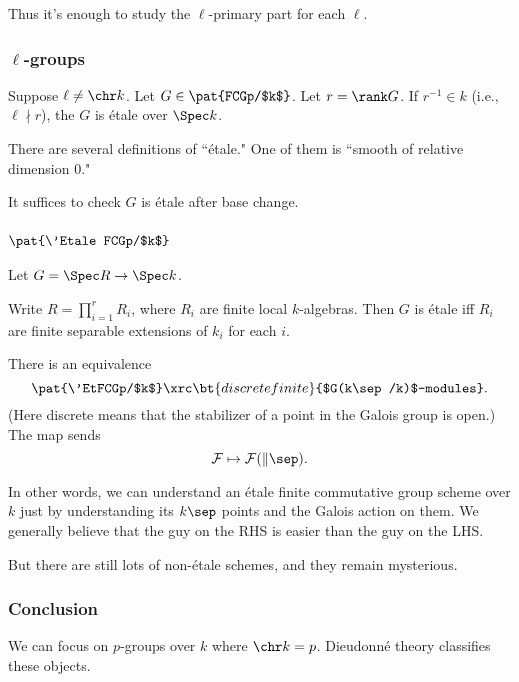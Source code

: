 Thus it's enough to study the $\ell$-primary part for each $\ell$.
\subsubsection{$\ell$-groups}

\begin{fct}
Suppose $\ell\ne \chr k$.
Let $G\in\pat{FCGp/$k$}$. Let $r=\rank G$. If $r^{-1}\in k$ (i.e., $\ell\nmid r$), the $G$ is \'etale over $\Spec k$.
\end{fct}
There are several definitions of ``\'etale." One of them is ``smooth of relative dimension 0."

It suffices to check $G$ is \'etale after base change. %
\subsubsection{$\pat{\'Etale FCGp/$k$}$}
Let $G=\Spec R\to \Spec k$.

Write $R=\prod_{i=1}^r R_i$, where $R_i$ are finite local $k$-algebras.
Then $G$ is \'etale iff $R_i$ are finite separable extensions of $k_i$ for each $i$.

\begin{pr}
There is an equivalence
\[
\pat{\'EtFCGp/$k$}\xrc \bt{discrete finite}{$G(k\sep/k)$-modules}.
\]
(Here discrete means that the stabilizer of a point in the Galois group is open.)
The map sends
\[
\cal F\mapsto \cal F(k\sep).%
\]
\end{pr}
In other words, we can understand an \'etale finite commutative group scheme over $k$ just by understanding its $k\sep$ points and the Galois action on them.
We generally believe that the guy on the RHS is easier than the guy on the LHS. 

But there are still lots of non-\'etale schemes, and they remain mysterious.

\subsubsection{Conclusion}
We can focus on $p$-groups over $k$ where $\chr k=p$. 
Dieudonn\'e theory classifies these objects.
